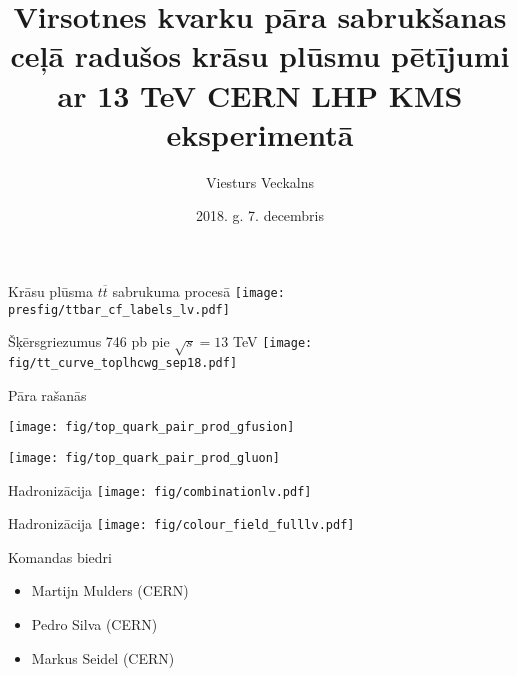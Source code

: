 \documentclass{beamer}
\title{Virsotnes kvarku pāra sabrukšanas ceļā radušos krāsu plūsmu pētījumi ar 13 TeV CERN LHP KMS eksperimentā}
\author{Viesturs Veckalns}
\institute{Rīgas Tehniskā universitāte}
\date{2018. g. 7. decembris}
\newcommand{\ttbar}{\ensuremath{t\overline{t}}\xspace}
\begin{document}
{
  \logo{}
  \begin{frame}
  \end{frame}
}


\begin{frame}{Krāsu plūsma \ttbar sabrukuma procesā}
  \centering
  \texttt{[image: presfig/ttbar\_cf\_labels\_lv.pdf]}
\end{frame}

\begin{frame}{Šķērsgriezumus}
  746 pb pie $\sqrt{s}=13$ TeV
  \centering
  \texttt{[image: fig/tt\_curve\_toplhcwg\_sep18.pdf]}
\end{frame}

\begin{frame}{Pāra rašanās}
  \centering
  \def\twidth{0.4}
  \begin{minipage}{\twidth\paperwidth}
    \texttt{[image: fig/top\_quark\_pair\_prod\_gfusion]}
    \label{fig:top_quark_production}
  \end{minipage}
  \begin{minipage}{\twidth\paperwidth}
    \texttt{[image: fig/top\_quark\_pair\_prod\_gluon]}
    \label{fig:top_quark_production2}
  \end{minipage}

\end{frame}

\begin{frame}{Hadronizācija}
  \centering
  \texttt{[image: fig/combinationlv.pdf]}
\end{frame}

\begin{frame}{Hadronizācija}
  \centering
  \texttt{[image: fig/colour\_field\_fulllv.pdf]}
\end{frame}

\begin{frame}{Komandas biedri}
  \begin{itemize}
  \item Martijn Mulders (CERN)
  \item Pedro Silva (CERN)
  \item Markus Seidel (CERN)
  \end{itemize}
\end{frame}
\end{document}
